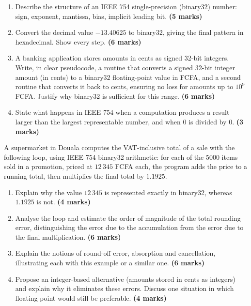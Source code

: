 \documentclass[11pt]{article}
\begin{document}
\begin{exercice}
\begin{enumerate}
\item Describe the structure of an IEEE 754 single-precision (binary32) number: sign, exponent, mantissa, bias, implicit leading bit. \textbf{(5 marks)}
\item Convert the decimal value $-13.40625$ to binary32, giving the final pattern in hexadecimal. Show every step. \textbf{(6 marks)}
\item A banking application stores amounts in cents as signed 32-bit integers. Write, in clear pseudocode, a routine that converts a signed 32-bit integer amount (in cents) to a binary32 floating-point value in FCFA, and a second routine that converts it back to cents, ensuring no loss for amounts up to $10^{9}$ FCFA. Justify why binary32 is sufficient for this range. \textbf{(6 marks)}
\item State what happens in IEEE 754 when a computation produces a result larger than the largest representable number, and when $0$ is divided by $0$. \textbf{(3 marks)}
\end{enumerate}
\end{exercice}

\begin{exercice}
A supermarket in Douala computes the VAT-inclusive total of a sale with the following loop, using IEEE 754 binary32 arithmetic: for each of the 5000 items sold in a promotion, priced at $12\,345$ FCFA each, the program adds the price to a running total, then multiplies the final total by $1.1925$.
\begin{enumerate}
\item Explain why the value $12\,345$ is represented exactly in binary32, whereas $1.1925$ is not. \textbf{(4 marks)}
\item Analyse the loop and estimate the order of magnitude of the total rounding error, distinguishing the error due to the accumulation from the error due to the final multiplication. \textbf{(6 marks)}
\item Explain the notions of round-off error, absorption and cancellation, illustrating each with this example or a similar one. \textbf{(6 marks)}
\item Propose an integer-based alternative (amounts stored in cents as integers) and explain why it eliminates these errors. Discuss one situation in which floating point would still be preferable. \textbf{(4 marks)}
\end{enumerate}
\end{exercice}
\end{document}
